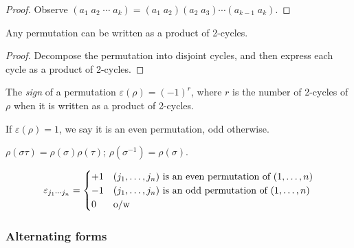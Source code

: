 \documentclass{../template/note}
\begin{document}
    \begin{proof}
        Observe \((a_1\;a_2\;\cdots\;a_k) = (a_1\;a_2)(a_2\;a_3)\cdots(a_{k-1}\;a_k)\).
    \end{proof}
    
    \begin{corollary}
        Any permutation can be written as a product of 2-cycles.
    \end{corollary}
    
    \begin{proof}
        Decompose the permutation into disjoint cycles, and then express each cycle as a product of 2-cycles.
    \end{proof}
    
    \begin{definition}
        The \emph{sign} of a permutation \(\varepsilon(\rho) = (-1)^r\), where \(r\) is the number of 2-cycles of \(\rho\) when it is written as a product of 2-cycles.

        If \(\varepsilon(\rho) = 1\), we say it is an even permutation, odd otherwise.
    \end{definition}

    \begin{remark*}
        \(\rho(\sigma \tau) = \rho(\sigma)\rho(\tau)\); \(\rho(\sigma^{-1}) = \rho(\sigma)\).
    \end{remark*}
    
    
    
    \begin{definition}
        \[
            \varepsilon_{j_1\cdots j_n} = \begin{cases}
                +1 & (j_1, \dots, j_n) \text{ is an even permutation of } (1, \dots, n) \\
                -1 & (j_1, \dots, j_n) \text{ is an odd permutation of } (1, \dots, n) \\
                0 & \text{o/w}
            \end{cases}
        \]
    \end{definition}
    

    \subsubsection{Alternating forms}
\end{document}
